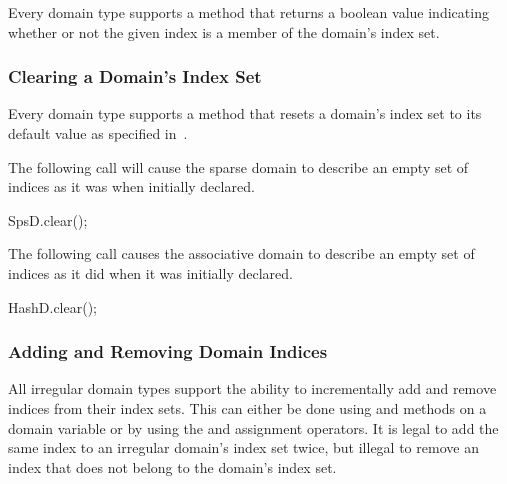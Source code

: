 Every domain type supports a  method that returns a
boolean value indicating whether or not the given index  is a
member of the domain's index set.

%
%

\subsubsection{Clearing a Domain's Index Set}
\label{Clearing_Domain_Indices}

Every domain type supports a  method that resets a
domain's index set to its default value as specified
in~.

\begin{example}
The following call will cause the sparse domain  to
describe an empty set of indices as it was when initially declared.
\begin{chapel}
SpsD.clear();
\end{chapel}
\end{example}

\begin{example}
The following call causes the associative domain  to
describe an empty set of indices as it did when it was initially
declared.
\begin{chapel}
HashD.clear();
\end{chapel}
\end{example}

\subsubsection{Adding and Removing Domain Indices}
\label{Adding_and_Removing_Domain_Indices}

All irregular domain types support the ability to incrementally add
and remove indices from their index sets.  This can either be done
using  and  methods on a
domain variable or by using the \chpl{+=} and \chpl{-=} assignment
operators.  It is legal to add the same index to an irregular domain's
index set twice, but illegal to remove an index that does not belong
to the domain's index set.

%
%

